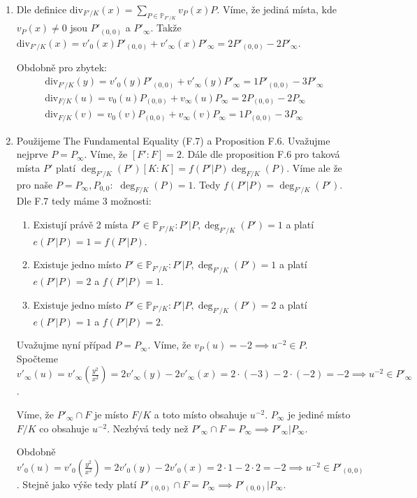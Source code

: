 \documentclass[12pt, a4paper]{article}
\begin{document}
\begin{enumerate}[label=(\alph*)]
    \item Dle definice $\text{div}_{F'/K}(x) = \sum\limits_{P \in \mathbb{P}_{F'/K}} v_P(x)P$. Víme, že jediná místa, kde $v_P(x) \neq 0$ jsou $P'_{(0,0)}$ a $P'_\infty$. Takže $\text{div}_{F'/K}(x) = v'_0(x)P'_{(0,0)}+ v'_\infty(x)P'_\infty = 2P'_{(0,0)} - 2P'_\infty$.

    Obdobně pro zbytek:
    \begin{gather*}
    \text{div}_{F'/K}(y) = v'_0(y)P'_{(0,0)}+ v'_\infty(y)P'_\infty = 1P'_{(0,0)} - 3P'_\infty\\
    \text{div}_{F/K}(u) = v_0(u)P_{(0,0)}+ v_\infty(u)P_\infty = 2P_{(0,0)} - 2P_\infty\\
    \text{div}_{F/K}(v) = v_0(v)P_{(0,0)}+ v_\infty(v)P_\infty = 1P_{(0,0)} - 3P_\infty
    \end{gather*}

    \item Použijeme The Fundamental Equality (F.7) a Proposition F.6. Uvažujme nejprve $P = P_\infty$. Víme, že $[F':F]=2$. Dále dle proposition F.6 pro taková místa $P'$ platí $\deg_{F'/K}(P')[K:K]=f(P'|P)\deg_{F/K}(P)$. Víme ale že pro naše $P=P_\infty, P_{0,0}:$ $\deg_{F/K}(P) = 1$. Tedy $f(P'|P)=\deg_{F'/K}(P')$. Dle F.7 tedy máme 3 možnosti:
    \begin{enumerate}
        \item Existují právě 2 místa $P' \in \mathbb{P}_{F'/K}: P'|P, \deg_{F'/K}(P') = 1$ a platí $e(P'|P)=1=f(P'|P)$.
        \item Existuje jedno místo $P' \in \mathbb{P}_{F'/K}: P'|P, \deg_{F'/K}(P') = 1$ a platí $e(P'|P)=2$ a $f(P'|P)=1$.
        \item Existuje jedno místo $P' \in \mathbb{P}_{F'/K}: P'|P, \deg_{F'/K}(P') = 2$ a platí $e(P'|P)=1$ a $f(P'|P)=2$.
    \end{enumerate}

    

    Uvažujme nyní případ $P=P_\infty$. Víme, že $v_P(u)=-2 \implies u^{-2} \in P$. Spočteme $v'_\infty(u) = v'_\infty(\frac{y^2}{x^2}) = 2v'_\infty(y)-2v'_\infty(x) = 2\cdot(-3)-2\cdot(-2) = -2 \implies u^{-2} \in P'_\infty$. 

    Víme, že $P'_\infty \cap F$ je místo $F/K$ a toto místo obsahuje $u^{-2}$. $P_\infty$ je jediné místo $F/K$ co obsahuje $u^{-2}$. Nezbývá tedy než $P'_\infty \cap F = P_\infty \implies P'_\infty | P_\infty$.

    Obdobně $v'_0(u) = v'_0(\frac{y^2}{x^2}) = 2v'_0(y)-2v'_0(x) = 2\cdot 1-2\cdot2 = -2 \implies u^{-2} \in P'_{(0,0)}$. Stejně jako výše tedy platí $P'_{(0,0)} \cap F = P_\infty \implies P'_{(0,0)} | P_\infty$. 


\end{enumerate}
\end{document}

